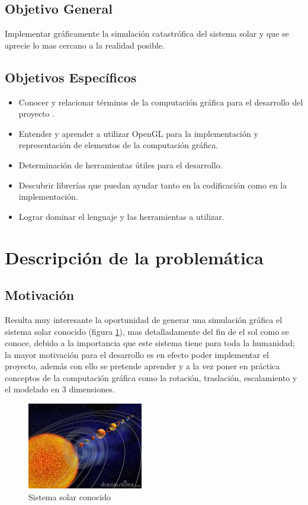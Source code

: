 \documentclass[12pt,journal,compsoc]{IEEEtran}
\begin{document}
\subsection{Objetivo General}
Implementar gráficamente la simulación catastrófica del sistema solar y que se aprecie lo mas cercano a la realidad posible.\\
\subsection{Objetivos Específicos}
\begin{itemize}
\item Conocer y relacionar términos de la computación gráfica para el desarrollo del proyecto \cite{foley}.
\item Entender y aprender a utilizar OpenGL para la implementación y representación de elementos de la computación gráfica.
\item Determinación de herramientas útiles para el desarrollo.
\item Descubrir librerías que puedan ayudar tanto en la codificación como en la implementación.
\item Lograr dominar el lenguaje y las herramientas a utilizar.
\end{itemize}

\section{Descripción de la problemática}
\subsection{Motivación}
Resulta muy interesante la oportunidad de generar una simulación gráfica el sistema solar \cite{astronomia} conocido (figura \ref{planetas}), mas detalladamente del fin de el sol como se conoce, debido a la importancia que este sistema tiene para toda la humanidad; la mayor motivación para el desarrollo es en efecto poder implementar el proyecto, además con ello se pretende aprender y a la vez poner en práctica conceptos de la computación gráfica como la rotación, traslación, escalamiento y el modelado en 3 dimensiones.\\
\begin{figure}[h!]
  \includegraphics[width=0.45\textwidth]{planetas.jpg}
  \caption{Sistema solar conocido}
  \captionsetup{justification=centering}
  \label{planetas}
\end{figure}
\end{document}

